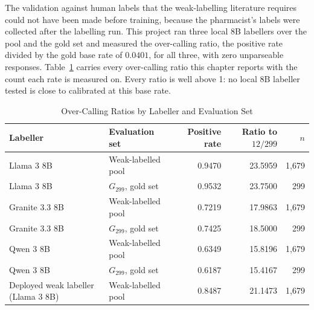The validation against human labels that the weak-labelling literature requires \citep[][see Chapter~\ref{ch:lit}]{pangakis2023validation} could not have been made before training, because the pharmacist's
labels were collected after the labelling run. This project ran
three local 8B labellers over the pool and the gold set and measured the
over-calling ratio, the positive rate divided by the gold base rate of
$0.0401$, for all three, with zero unparseable responses. Table~\ref{tab:overcalling}
carries every over-calling ratio this chapter reports with the count each rate
is measured on. Every ratio is well above 1: no local 8B labeller tested is
close to calibrated at this base rate.

\begin{table}[!htbp]
\caption{Over-Calling Ratios by Labeller and Evaluation Set}
\label{tab:overcalling}
\centering
\small
\begin{tabular}{@{}>{\tblragged}p{1.7in}>{\tblragged}p{1.3in}rrr@{}}
\toprule
\textbf{Labeller} & \textbf{Evaluation set} & \textbf{Positive rate} & \textbf{Ratio to $12/299$} & \textbf{$n$} \\
\midrule
Llama 3 8B              & Weak-labelled pool                & 0.9470 & 23.5959 & 1,679 \\
\addlinespace
Llama 3 8B              & $G_{299}$, gold set                & 0.9532 & 23.7500 & 299   \\
\addlinespace
Granite 3.3 8B          & Weak-labelled pool                & 0.7219 & 17.9863 & 1,679 \\
\addlinespace
Granite 3.3 8B          & $G_{299}$, gold set                & 0.7425 & 18.5000 & 299   \\
\addlinespace
Qwen 3 8B               & Weak-labelled pool                & 0.6349 & 15.8196 & 1,679 \\
\addlinespace
Qwen 3 8B               & $G_{299}$, gold set                & 0.6187 & 15.4167 & 299   \\
\addlinespace
Deployed weak labeller (Llama 3 8B) & Weak-labelled pool & 0.8487 & 21.1473 & 1,679 \\
\bottomrule
\end{tabular}
\end{table}

